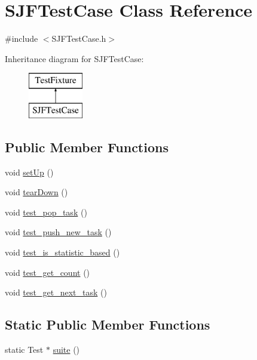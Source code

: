 \hypertarget{class_s_j_f_test_case}{}\section{S\+J\+F\+Test\+Case Class Reference}
\label{class_s_j_f_test_case}


{\ttfamily \#include $<$S\+J\+F\+Test\+Case.\+h$>$}

Inheritance diagram for S\+J\+F\+Test\+Case\+:\begin{figure}[H]
\begin{center}
\leavevmode
\includegraphics[height=2.000000cm]{class_s_j_f_test_case}
\end{center}
\end{figure}
\subsection*{Public Member Functions}
\begin{DoxyCompactItemize}
\item 
void \hyperlink{class_s_j_f_test_case_a60802b4d079974043d4e3baef703bcd1}{set\+Up} ()
\item 
void \hyperlink{class_s_j_f_test_case_a5d9d9367be49a961f6b4babce4fd1fa6}{tear\+Down} ()
\item 
void \hyperlink{class_s_j_f_test_case_a8a60cf0b180bbfa45cc87a390e9feea2}{test\+\_\+pop\+\_\+task} ()
\item 
void \hyperlink{class_s_j_f_test_case_acb01215c03c9c2d1d106c50256072128}{test\+\_\+push\+\_\+new\+\_\+task} ()
\item 
void \hyperlink{class_s_j_f_test_case_ad1e7aef024b053a300dbf57884e8e21b}{test\+\_\+is\+\_\+statistic\+\_\+based} ()
\item 
void \hyperlink{class_s_j_f_test_case_abdef7d1c7d5d42959626b05bb5cde82d}{test\+\_\+get\+\_\+count} ()
\item 
void \hyperlink{class_s_j_f_test_case_a7953aefbd4ff5f4af75b2de09e8bb91f}{test\+\_\+get\+\_\+next\+\_\+task} ()
\end{DoxyCompactItemize}
\subsection*{Static Public Member Functions}
\begin{DoxyCompactItemize}
\item 
static Test $\ast$ \hyperlink{class_s_j_f_test_case_ab7356943d18befb6e383b68857093503}{suite} ()
\end{DoxyCompactItemize}


